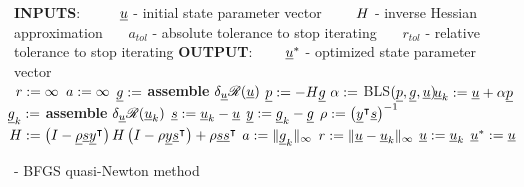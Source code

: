 \begin{algorithm}
  \normalsize
  \begin{algorithmic}[1]
    \State \textbf{INPUTS}:
    \State \ \ \ $\phantom{a_{tol}}\mathllap{\rankone{u}}$ - initial state parameter vector
    \State \ \ \ $\phantom{a_{tol}}\mathllap{H}$ - inverse Hessian approximation
    \State \ \ \ $a_{tol}$ - absolute tolerance to stop iterating
    \State \ \ \ $r_{tol}$ - relative tolerance to stop iterating
    \State \textbf{OUTPUT}:
    \State \ \ \ $\phantom{a_{tol}}\mathllap{\rankone{u}^*}$ - optimized state parameter vector
    \\
    \hrulefill
      \State $\phantom{\rankone{\vartheta}}\mathllap{r} := \infty$
      \State $\phantom{\rankone{\vartheta}}\mathllap{a} := \infty$
        \State $\phantom{\rankone{p}}\mathllap{\rankone{g}} :=$ \textbf{assemble} $\delta_{\underline{u}} \mathscr{R}(\underline{u})$
        \State $\underline{p} := - H \underline{g}$
        \State $\phantom{\rankone{p}}\mathllap{\alpha} :=$ BLS$(\underline{p}, \underline{g}, \underline{u})$
        \State $\phantom{\rankone{p}}\mathllap{\rankone{u}_k} := \rankone{u} + \alpha \rankone{p}$
        \State $\phantom{\rankone{p}}\mathllap{\rankone{g}_k} :=$ \textbf{assemble} $\delta_{\underline{u}} \mathscr{R}(\underline{u}_k)$
        \State $\phantom{\rankone{p}}\mathllap{\rankone{s}} := \rankone{u}_k - \rankone{u}$
        \State $\phantom{\rankone{p}}\mathllap{\rankone{y}} := \rankone{g}_k - \rankone{g}$
        \State $\phantom{\rankone{p}}\mathllap{\rho} := \left( \rankone{y}\T \rankone{s} \right)^{-1}$
        \State $\phantom{\rankone{p}}\mathllap{H} := \left( I - \rankone{\rho} \rankone{s} \rankone{y}\T \right) H \left( I - \rho \rankone{y} \rankone{s}\T \right) + \rho \rankone{s} \rankone{s}\T$
        \State $\phantom{\rankone{p}}\mathllap{a} := \Vert \rankone{g}_k \Vert_{\infty}$
        \State $\phantom{\rankone{p}}\mathllap{r} := \Vert \rankone{u} - \rankone{u}_k \Vert_{\infty}$
        \State $\phantom{\rankone{p}}\mathllap{\rankone{u}} := \rankone{u}_k$
      \EndWhile
    \State \Return $\underline{u}^* := \underline{u}$ 
    \EndFunction
  \end{algorithmic}
  \caption[BFGS]{ - BFGS quasi-Newton method}
  \label{BFGS_alg}
\end{algorithm}

